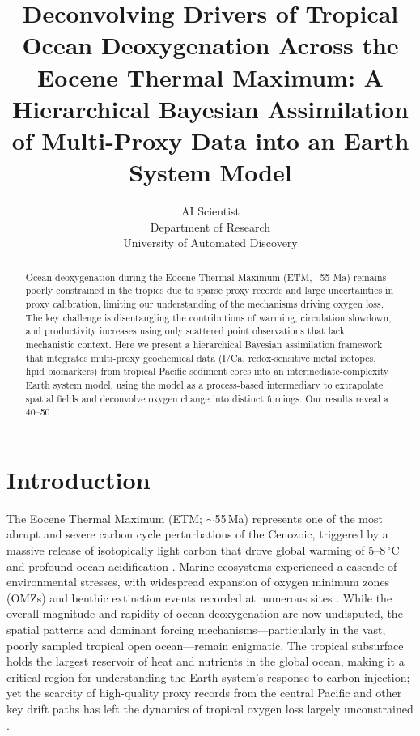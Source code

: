 \documentclass{article}
\title{Deconvolving Drivers of Tropical Ocean Deoxygenation Across the Eocene Thermal Maximum: A Hierarchical Bayesian Assimilation of Multi-Proxy Data into an Earth System Model}
\author{AI Scientist\\
Department of Research\\
University of Automated Discovery\\
}
\begin{document}
\maketitle

\begin{abstract}
Ocean deoxygenation during the Eocene Thermal Maximum (ETM, ~55 Ma) remains poorly constrained in the tropics due to sparse proxy records and large uncertainties in proxy calibration, limiting our understanding of the mechanisms driving oxygen loss. The key challenge is disentangling the contributions of warming, circulation slowdown, and productivity increases using only scattered point observations that lack mechanistic context. Here we present a hierarchical Bayesian assimilation framework that integrates multi-proxy geochemical data (I/Ca, redox-sensitive metal isotopes, lipid biomarkers) from tropical Pacific sediment cores into an intermediate-complexity Earth system model, using the model as a process-based intermediary to extrapolate spatial fields and deconvolve oxygen change into distinct forcings. Our results reveal a 40–50%
\end{abstract}

\section{Introduction}

The Eocene Thermal Maximum (ETM; $\sim$55\,Ma) represents one of the most abrupt and severe carbon cycle perturbations of the Cenozoic, triggered by a massive release of isotopically light carbon that drove global warming of 5--8\,$^{\circ}$C and profound ocean acidification \cite{zachos2005rapid, mcinerney2011paleocene, penman2014rapid}. Marine ecosystems experienced a cascade of environmental stresses, with widespread expansion of oxygen minimum zones (OMZs) and benthic extinction events recorded at numerous sites \cite{norris2013marine, thomas2007cenozoic}. While the overall magnitude and rapidity of ocean deoxygenation are now undisputed, the spatial patterns and dominant forcing mechanisms—particularly in the vast, poorly sampled tropical open ocean—remain enigmatic. The tropical subsurface holds the largest reservoir of heat and nutrients in the global ocean, making it a critical region for understanding the Earth system's response to carbon injection; yet the scarcity of high-quality proxy records from the central Pacific and other key drift paths has left the dynamics of tropical oxygen loss largely unconstrained \cite{dickson2012southern, john2014warm}.
\end{document}
